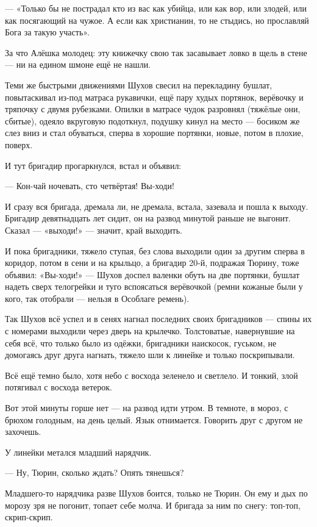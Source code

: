 --- «Только бы не пострадал кто из вас как убийца, или как вор, или злодей, или как посягающий 
на чужое. А если как христианин, то не стыдись, но прославляй Бога за такую участь».

За что Алёшка молодец: эту книжечку свою так засавывает ловко в щель в стене --- ни на едином 
шмоне ещё не нашли.

Теми же быстрыми движениями Шухов свесил на перекладину бушлат, повытаскивал из-под матраса 
рукавички, ещё пару худых портянок, верёвочку и тряпочку с двумя рубезками. Опилки в матрасе 
чудок разровнял (тяжёлые они, сбитые), одеяло вкруговую подоткнул, подушку кинул на место --- 
босиком же слез вниз и стал обуваться, сперва в хорошие портянки, новые, потом в плохие, 
поверх.

И тут бригадир прогаркнулся, встал и объявил:

--- Кон-чай ночевать, сто четвёртая! Вы-ходи!

И сразу вся бригада, дремала ли, не дремала, встала, зазевала и пошла к выходу. Бригадир 
девятнадцать лет сидит, он на развод минутой раньше не выгонит. Сказал --- «выходи!» --- значит, 
край выходить.

И пока бригадники, тяжело ступая, без слова выходили один за другим сперва в коридор, потом в 
сени и на крыльцо, а бригадир 20-й, подражая Тюрину, тоже объявил: «Вы-ходи!» --- Шухов доспел 
валенки обуть на две портянки, бушлат надеть сверх телогрейки и туго вспоясаться верёвочкой 
(ремни кожаные были у кого, так отобрали --- нельзя в Особлаге ремень).

Так Шухов всё успел и в сенях нагнал последних своих бригадников --- спины их с номерами 
выходили через дверь на крылечко. Толстоватые, навернувшие на себя всё, что только было из 
одёжки, бригадники наискосок, гуськом, не домогаясь друг друга нагнать, тяжело шли к линейке 
и только поскрипывали.

Всё ещё темно было, хотя небо с восхода зеленело и светлело. И тонкий, злой потягивал с 
восхода ветерок.

Вот этой минуты горше нет --- на развод идти утром. В темноте, в мороз, с брюхом голодным, на 
день целый. Язык отнимается. Говорить друг с другом не захочешь.

У линейки метался младший нарядчик.

--- Ну, Тюрин, сколько ждать? Опять тянешься?

Младшего-то нарядчика разве Шухов боится, только не Тюрин. Он ему и дых по морозу зря не 
погонит, топает себе молча. И бригада за ним по снегу: топ-топ, скрип-скрип.

